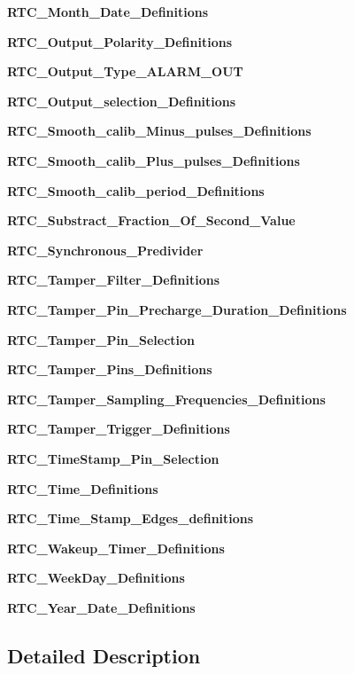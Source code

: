 \begin{DoxyCompactItemize}
\textbf{ R\+T\+C\+\_\+\+Month\+\_\+\+Date\+\_\+\+Definitions}
\item 
\textbf{ R\+T\+C\+\_\+\+Output\+\_\+\+Polarity\+\_\+\+Definitions}
\item 
\textbf{ R\+T\+C\+\_\+\+Output\+\_\+\+Type\+\_\+\+A\+L\+A\+R\+M\+\_\+\+O\+UT}
\item 
\textbf{ R\+T\+C\+\_\+\+Output\+\_\+selection\+\_\+\+Definitions}
\item 
\textbf{ R\+T\+C\+\_\+\+Smooth\+\_\+calib\+\_\+\+Minus\+\_\+pulses\+\_\+\+Definitions}
\item 
\textbf{ R\+T\+C\+\_\+\+Smooth\+\_\+calib\+\_\+\+Plus\+\_\+pulses\+\_\+\+Definitions}
\item 
\textbf{ R\+T\+C\+\_\+\+Smooth\+\_\+calib\+\_\+period\+\_\+\+Definitions}
\item 
\textbf{ R\+T\+C\+\_\+\+Substract\+\_\+\+Fraction\+\_\+\+Of\+\_\+\+Second\+\_\+\+Value}
\item 
\textbf{ R\+T\+C\+\_\+\+Synchronous\+\_\+\+Predivider}
\item 
\textbf{ R\+T\+C\+\_\+\+Tamper\+\_\+\+Filter\+\_\+\+Definitions}
\item 
\textbf{ R\+T\+C\+\_\+\+Tamper\+\_\+\+Pin\+\_\+\+Precharge\+\_\+\+Duration\+\_\+\+Definitions}
\item 
\textbf{ R\+T\+C\+\_\+\+Tamper\+\_\+\+Pin\+\_\+\+Selection}
\item 
\textbf{ R\+T\+C\+\_\+\+Tamper\+\_\+\+Pins\+\_\+\+Definitions}
\item 
\textbf{ R\+T\+C\+\_\+\+Tamper\+\_\+\+Sampling\+\_\+\+Frequencies\+\_\+\+Definitions}
\item 
\textbf{ R\+T\+C\+\_\+\+Tamper\+\_\+\+Trigger\+\_\+\+Definitions}
\item 
\textbf{ R\+T\+C\+\_\+\+Time\+Stamp\+\_\+\+Pin\+\_\+\+Selection}
\item 
\textbf{ R\+T\+C\+\_\+\+Time\+\_\+\+Definitions}
\item 
\textbf{ R\+T\+C\+\_\+\+Time\+\_\+\+Stamp\+\_\+\+Edges\+\_\+definitions}
\item 
\textbf{ R\+T\+C\+\_\+\+Wakeup\+\_\+\+Timer\+\_\+\+Definitions}
\item 
\textbf{ R\+T\+C\+\_\+\+Week\+Day\+\_\+\+Definitions}
\item 
\textbf{ R\+T\+C\+\_\+\+Year\+\_\+\+Date\+\_\+\+Definitions}
\end{DoxyCompactItemize}


\subsection{Detailed Description}
